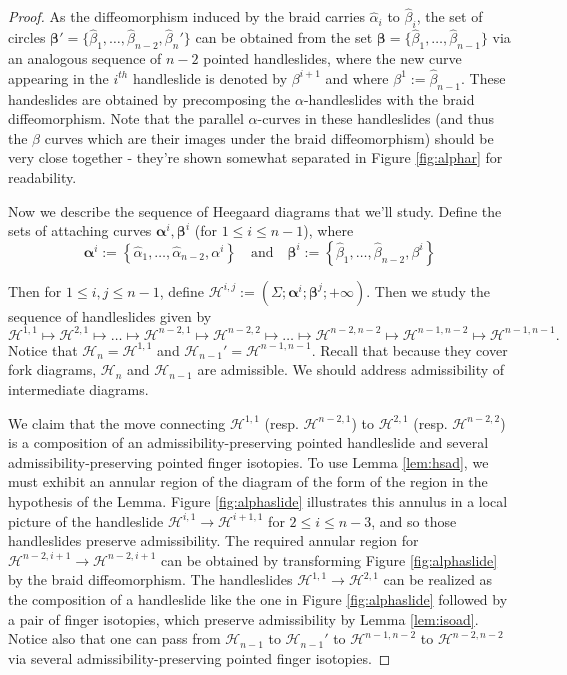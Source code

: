 \documentclass[11pt]{article}
\theoremstyle{plain} \newtheorem{thm}{Theorem}[subsection]
\theoremstyle{plain} \newtheorem{cor}[thm]{Corollary}
\theoremstyle{plain} \newtheorem{prop}[thm]{Proposition}
\theoremstyle{plain} \newtheorem{conj}[thm]{Conjecture}
\theoremstyle{plain} \newtheorem{lem}[thm]{Lemma}
\theoremstyle{definition} \newtheorem{df}[thm]{Definition}
\theoremstyle{remark} \newtheorem{rmk}[thm]{Remark}
\theoremstyle{remark} \newtheorem{obs}[thm]{Observation}
\newcommand{\h}{\mathcal{H}}
\newcommand{\ah}{\widehat{\alpha}}
\newcommand{\bh}{\widehat{\beta}}
\newcommand{\ba}{\boldsymbol{\alpha}}
\newcommand{\bb}{\boldsymbol{\beta}}
\numberwithin{equation}{section}
\begin{document}
\begin{proof}
As the diffeomorphism induced by the braid carries $\ah_i$ to $\bh_i$,  the set  of circles $\bb' =  \{ \bh_{1}, \ldots, \bh_{n-2}, \bh_{n}' \}$ can be obtained from the set $\bb = \{ \bh_{1}, \ldots, \bh_{n-1} \}$ via an analogous sequence of $n-2$ pointed handleslides, where the new curve appearing in the $i^{th}$ handleslide is denoted by $\beta^{i+1}$ and where $\beta^1 := \bh_{n-1}$.  These handeslides are obtained by precomposing the $\alpha$-handleslides with the braid diffeomorphism.  Note that  the parallel $\alpha$-curves in these handleslides (and thus the $\beta$ curves which are their images under the braid diffeomorphism) should be very close together - they're shown somewhat separated in Figure \ref{fig:alphar} for readability.

Now we describe the sequence of Heegaard diagrams that we'll study.  Define the sets of attaching curves $\ba^i, \bb^i$ (for $1 \leq i \leq n-1$), where
$$ \ba^i := \left\{ \ah_{1}, \ldots, \ah_{n-2}, \alpha^{i} \right\} \quad \text{and}\quad
\bb^i := \left\{ \bh_{1}, \ldots, \bh_{n-2}, \beta^{i} \right\}$$

Then for $1 \leq i,j \leq n-1$, define $\h^{i,j}:= \left( \Sigma; \ba^i; \bb^j; +\infty \right)$.  Then we study the sequence of handleslides given by
$$ \h^{1,1} \mapsto \h^{2,1} \mapsto \ldots \mapsto \h^{n-2,1} \mapsto \h^{n-2,2} \mapsto \ldots \mapsto \h^{n-2,n-2} \mapsto \h^{n-1,n-2} \mapsto \h^{n-1,n-1}.$$
Notice that $\h_{n} = \h^{1,1}$ and $\h_{n-1}' = \h^{n-1,n-1}$.  Recall that because they cover fork diagrams, $\h_{n}$ and $\h_{n-1}$ are admissible.  We should address admissibility of intermediate diagrams.

We claim that the move connecting $\h^{1,1}$ (resp. $\h^{n-2,1}$) to $\h^{2,1}$ (resp. $\h^{n-2,2}$) is a composition of an admissibility-preserving pointed handleslide and several admissibility-preserving pointed finger isotopies.  To use Lemma \ref{lem:hsad}, we must exhibit an annular region of the diagram of the form of the region in the hypothesis of the Lemma.  Figure \ref{fig:alphaslide} illustrates this annulus in a local picture of the handleslide $\h^{i,1} \rightarrow \h^{i+1,1}$ for $2 \leq i \leq n-3$, and so those handleslides preserve admissibility.  The required annular region for $\h^{n-2, i+1} \rightarrow \h^{n-2, i+1}$ can be obtained by transforming Figure \ref{fig:alphaslide} by the braid diffeomorphism.  The handleslides $\h^{1,1} \rightarrow \h^{2,1}$ can be realized as the composition of a handleslide like the one in Figure \ref{fig:alphaslide} followed by a pair of finger isotopies, which preserve admissibility by Lemma \ref{lem:isoad}.  Notice also that one can pass from $\h_{n-1}$ to $\h_{n-1}'$ to $\h^{n-1,n-2}$ to $\h^{n-2,n-2}$ via several admissibility-preserving pointed finger isotopies.


\end{proof}
\end{document}
